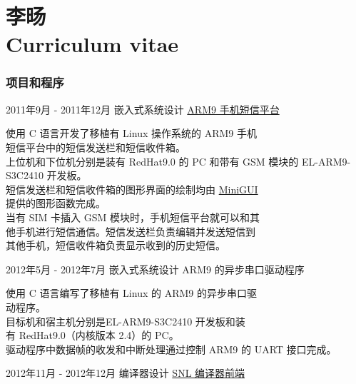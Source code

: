 \documentclass{tccv}
\begin{document}
\part{\VeraSansYuanTi 李旸\\
  \ZapfChancery Curriculum vitae}

\section{\ShiShangZhongHeiJianTi 项目和程序}

\begin{eventlist}


\item{\ShiShangZhongHeiJianTi 2011年9月 - 2011年12月}
  {\ShiShangZhongHeiJianTi 嵌入式系统设计}
  {\href{https://github.com/YoungLeeNENU/MessagePlatform}{\VeraSansYuanTi ARM9 手机短信平台}}

  \HiraginoSansGB
  使用 C 语言开发了移植有 Linux 操作系统的 ARM9 手机 \\
  短信平台中的短信发送栏和短信收件箱。\\
  上位机和下位机分别是装有 RedHat9.0 的 PC 和带有 GSM 模块的 EL-ARM9-S3C2410 开发板。\\
  短信发送栏和短信收件箱的图形界面的绘制均由 \href{http://www.minigui.org/en/}{MiniGUI} \\
  提供的图形函数完成。\\
  当有 SIM 卡插入 GSM 模块时，手机短信平台就可以和其 \\
  他手机进行短信通信。短信发送栏负责编辑并发送短信到 \\
  其他手机，短信收件箱负责显示收到的历史短信。
  

\item{\ShiShangZhongHeiJianTi 2012年5月 - 2012年7月}
  {\ShiShangZhongHeiJianTi 嵌入式系统设计}
  {\VeraSansYuanTi ARM9 的异步串口驱动程序}
  
  \HiraginoSansGB
  使用 C 语言编写了移植有 Linux 的 ARM9 的异步串口驱 \\
  动程序。\\
  目标机和宿主机分别是EL-ARM9-S3C2410 开发板和装 \\
  有 RedHat9.0（内核版本 2.4）的 PC。\\
  驱动程序中数据帧的收发和中断处理通过控制 ARM9 的 UART 接口完成。
  

\item{\ShiShangZhongHeiJianTi 2012年11月 - 2012年12月}
  {\ShiShangZhongHeiJianTi 编译器设计}
  {\href{https://github.com/YoungLeeNENU/A-samll-compiler-frontend}{\VeraSansYuanTi SNL 编译器前端}}
  

\end{eventlist}
\end{document}
